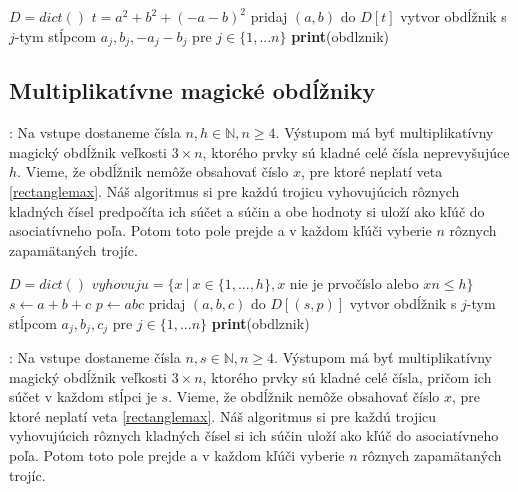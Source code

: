 \begin{algorithmic}
\STATE $D = dict()$
		\STATE $t = a^2 + b^2 + (-a-b)^2$
		\STATE pridaj $(a,b)$ do $D[t]$
	\ENDFOR
\ENDFOR
{}
				\STATE vytvor obdĺžnik s $j$-tym stĺpcom $a_j, b_j, - a_j - b_j$ pre $j \in \{1, ... n\}$
					\STATE \textbf{print}(obdlznik)
				\ENDIF
			\ENDFOR
		\ENDIF
	\ENDFOR
\ENDFOR
\end{algorithmic}


\subsection{Multiplikatívne magické obdĺžniky}

\begin{subalg}: Na vstupe dostaneme čísla $n,h \in \mathbb{N}, n \geq 4$. Výstupom má byť multiplikatívny magický obdĺžnik veľkosti $3 \times n$, ktorého prvky sú kladné celé čísla neprevyšujúce $h$. Vieme, že obdĺžnik nemôže obsahovať číslo $x$, pre ktoré neplatí veta \ref{rectanglemax}. Náš algoritmus si pre každú trojicu vyhovujúcich rôznych kladných čísel predpočíta ich súčet a súčin a obe hodnoty si uloží ako kľúč do asociatívneho poľa. Potom toto pole prejde a v každom kľúči vyberie $n$ rôznych zapamätaných trojíc.
\end{subalg}

\begin{algorithmic}
\STATE $D = dict()$
\STATE $vyhovuju = \{x ~|~ x \in \{1, ... , h\}, x$ nie je prvočíslo alebo $xn \leq h\}$
	\STATE $s \gets a+b+c$
	\STATE $p \gets abc$
	\STATE pridaj $(a,b,c)$ do $D[(s,p)]$
\ENDFOR
{}
				\STATE vytvor obdĺžnik s $j$-tym stĺpcom $a_{j}, b_{j}, c_{j}$ pre $j \in \{1, ... n\}$
					\STATE \textbf{print}(obdlznik)
				\ENDIF
			\ENDFOR
		\ENDIF
	\ENDFOR
\ENDFOR
\end{algorithmic}

\begin{subalg}: Na vstupe dostaneme čísla $n,s \in \mathbb{N}, n \geq 4$. Výstupom má byť multiplikatívny magický obdĺžnik veľkosti $3 \times n$, ktorého prvky sú kladné celé čísla, pričom ich súčet v každom stĺpci je $s$. Vieme, že obdĺžnik nemôže obsahovať číslo $x$, pre ktoré neplatí veta \ref{rectanglemax}. Náš algoritmus si pre každú trojicu vyhovujúcich rôznych kladných čísel si ich súčin uloží ako kľúč do asociatívneho poľa. Potom toto pole prejde a v každom kľúči vyberie $n$ rôznych zapamätaných trojíc.
\end{subalg}

